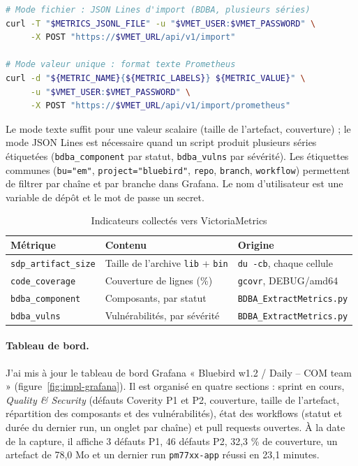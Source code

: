 \begin{lstlisting}[language=bash,caption={Deux modes d'envoi des métriques},label={lst:impl-vm}]
# Mode fichier : JSON Lines d'import (BDBA, plusieurs séries)
curl -T "$METRICS_JSONL_FILE" -u "$VMET_USER:$VMET_PASSWORD" \
     -X POST "https://$VMET_URL/api/v1/import"

# Mode valeur unique : format texte Prometheus
curl -d "${METRIC_NAME}{${METRIC_LABELS}} ${METRIC_VALUE}" \
     -u "$VMET_USER:$VMET_PASSWORD" \
     -X POST "https://$VMET_URL/api/v1/import/prometheus"
\end{lstlisting}

Le mode texte suffit pour une valeur scalaire (taille de l'artefact,
couverture) ; le mode JSON Lines est nécessaire quand un script produit
plusieurs séries étiquetées (\texttt{bdba\_component} par statut,
\texttt{bdba\_vulns} par sévérité). Les étiquettes communes
(\texttt{bu="em"}, \texttt{project="bluebird"}, \texttt{repo},
\texttt{branch}, \texttt{workflow}) permettent de filtrer par chaîne et par
branche dans Grafana. Le nom d'utilisateur est une variable de dépôt et le mot de
passe un secret.

\begin{table}[H]
\centering
\caption{Indicateurs collectés vers VictoriaMetrics}
\label{tab:impl-indicateurs}
\small
\begin{tabularx}{\textwidth}{@{}l X l@{}}
\toprule
\textbf{Métrique} & \textbf{Contenu} & \textbf{Origine} \\
\midrule
\texttt{sdp\_artifact\_size} & Taille de l'archive \texttt{lib} + \texttt{bin} & \texttt{du -cb}, chaque cellule \\
\texttt{code\_coverage} & Couverture de lignes (\%) & \texttt{gcovr}, DEBUG/amd64 \\
\texttt{bdba\_component} & Composants, par statut & \texttt{BDBA\_ExtractMetrics.py} \\
\texttt{bdba\_vulns} & Vulnérabilités, par sévérité & \texttt{BDBA\_ExtractMetrics.py} \\
\bottomrule
\end{tabularx}
\end{table}

\paragraph{Tableau de bord.} J'ai mis à jour le tableau de bord Grafana
« Bluebird w1.2 / Daily -- COM team » (figure~\ref{fig:impl-grafana}). Il est
organisé en quatre sections : sprint en cours, \emph{Quality \& Security}
(défauts Coverity P1 et P2, couverture, taille de l'artefact, répartition des
composants et des vulnérabilités), état des workflows (statut et durée du
dernier run, un onglet par chaîne) et pull requests ouvertes. À la date de la
capture, il affiche 3 défauts P1, 46 défauts P2, 32,3 \% de couverture, un
artefact de 78,0 Mo et un dernier run \texttt{pm77xx-app} réussi en 23,1 minutes.


